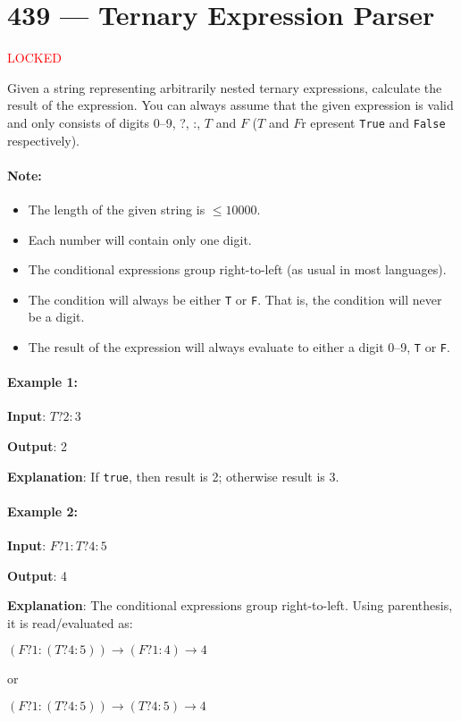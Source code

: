 \section{439 --- Ternary Expression Parser}
\textcolor{red}{LOCKED} 

Given a string representing arbitrarily nested ternary expressions, calculate the result of the expression. You can always assume that the given expression is valid and only consists of digits 0--9, ?, :, $T$ and $F$ ($T$ and $F$r epresent \texttt{True} and \texttt{False} respectively).

\paragraph{Note:}

\begin{itemize}
\item The length of the given string is $\leq 10000$.
\item Each number will contain only one digit.
\item The conditional expressions group right-to-left (as usual in most languages).
\item The condition will always be either \texttt{T} or \texttt{F}. That is, the condition will never be a digit.
\item The result of the expression will always evaluate to either a digit 0--9, \texttt{T} or \texttt{F}.
\end{itemize}
 

\paragraph{Example 1:}

\begin{flushleft}
\textbf{Input}: $T?2:3$

\textbf{Output}: 2

\textbf{Explanation}: If \texttt{true}, then result is 2; otherwise result is 3.
\end{flushleft}
 

\paragraph{Example 2:}

\begin{flushleft}
\textbf{Input}: $F?1:T?4:5$

\textbf{Output}: 4

\textbf{Explanation}: The conditional expressions group right-to-left. Using parenthesis, it is read/evaluated as:

$(F ? 1 : (T ? 4 : 5)) \longrightarrow (F ? 1 : 4) \longrightarrow 4$

or

$(F ? 1 : (T ? 4 : 5)) \longrightarrow (T ? 4 : 5) \longrightarrow 4$
 
\end{flushleft}


